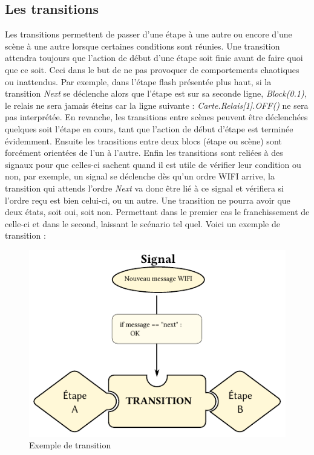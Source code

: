\subsection{Les transitions}
Les transitions permettent de passer d'une étape à une autre ou encore d'une scène à une autre lorsque certaines conditions sont réunies.\p
Une transition attendra toujours que l'action de début d'une étape soit finie avant de faire quoi que ce soit. Ceci dans le but de ne pas provoquer de comportements chaotiques ou inattendus. Par exemple, dans l'étape flash présentée plus haut, si la transition \textit{Next} se déclenche alors que l'étape est sur sa seconde ligne, \textit{Block(0.1)}, le relais ne sera jamais éteins car la ligne suivante : \textit{Carte.Relais[1].OFF()} ne sera pas interprétée.\p
En revanche, les transitions entre scènes peuvent être déclenchées quelques soit l'étape en cours, tant que l'action de début d'étape est terminée évidemment.\p
Ensuite les transitions entre deux blocs (étape ou scène) sont forcément orientées de l'un à l'autre.\p
Enfin les transitions sont reliées à des signaux pour que celles-ci sachent quand il est utile de vérifier leur condition ou non, par exemple, un signal se déclenche dès qu'un ordre WIFI arrive, la transition qui attends l'ordre \textit{Next} va donc être lié à ce signal et vérifiera si l'ordre reçu est bien celui-ci, ou un autre.\p
Une transition ne pourra avoir que deux états, soit oui, soit non. Permettant dans le premier cas le franchissement de celle-ci et dans le second, laissant le scénario tel quel.\p
Voici un exemple de transition :
\begin{figure}[htbp]
  \centering
  \includegraphics[width=.80\textwidth]{figs/transition.pdf}
  \caption{Exemple de transition}
  \label{fig:transition}
\end{figure} ~\\

